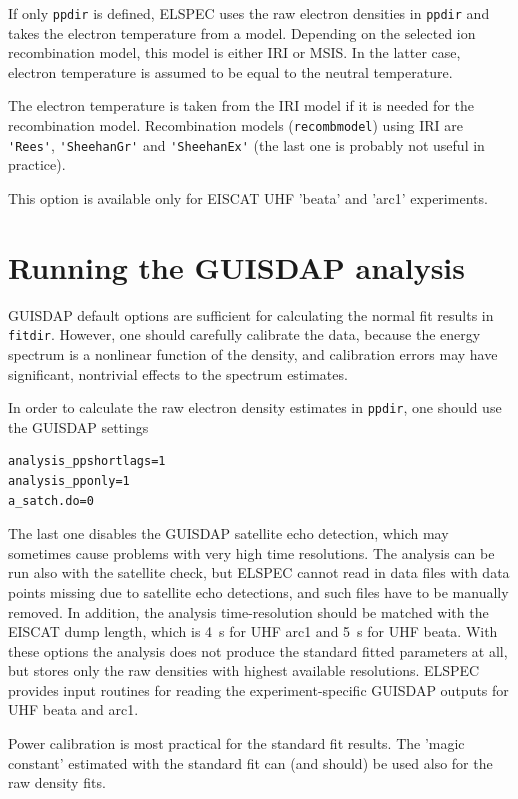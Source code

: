 \documentclass[12pt,a4paper]{report}
\begin{document}
If only \verb|ppdir| is defined, ELSPEC uses the raw electron densities in \verb|ppdir| and takes the electron temperature from a model. Depending on the selected ion recombination model, this model is either IRI or MSIS. In the latter case, electron temperature is assumed to be equal to the neutral temperature. 

The electron temperature is taken from the IRI model if it is needed for the recombination model. Recombination models (\verb|recombmodel|) using IRI are \verb|'Rees'|, \verb|'SheehanGr'| and \verb|'SheehanEx'| (the last one is probably not useful in practice).

This option is available only for EISCAT UHF 'beata' and 'arc1' experiments. 


\section{Running the GUISDAP analysis}\label{secGUISDAP}

GUISDAP default options are sufficient for calculating the normal fit results in \verb|fitdir|. However, one should carefully calibrate the data, because the energy spectrum is a nonlinear function of the density, and calibration errors may have significant, nontrivial effects to the spectrum estimates. 

In order to calculate the raw electron density estimates in \verb|ppdir|, one should use the GUISDAP settings
\begin{verbatim}
analysis_ppshortlags=1
analysis_pponly=1
a_satch.do=0 
\end{verbatim}
The last one disables the GUISDAP satellite echo detection, which may sometimes cause problems with very high time resolutions. The analysis can be run also with the satellite check, but ELSPEC cannot read in data files with data points missing due to satellite echo detections, and such files have to be manually removed. In addition, the analysis time-resolution should be matched with the EISCAT dump length, which is 4~s for UHF arc1 and 5~s for UHF beata. With these options the analysis does not produce the standard fitted parameters at all, but stores only the raw densities with highest available resolutions. ELSPEC provides input routines for reading the experiment-specific GUISDAP outputs for UHF beata and arc1. 

Power calibration is most practical for the standard fit results. The 'magic constant' estimated with the standard fit can (and should) be used also for the raw density fits. 
\end{document}
